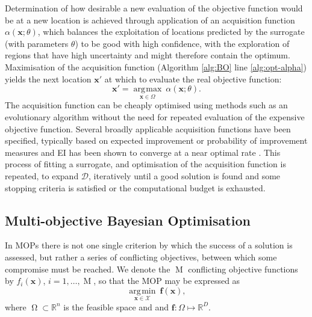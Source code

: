 \documentclass[conference]{IEEEtran}
\DeclareMathOperator*{\parameterspace}{\Omega}
\DeclareMathOperator*{\nobj}{M}
\DeclareMathOperator*{\argmax}{\arg\!\max}
\DeclareMathOperator*{\argmin}{\arg\!\min}
\newcommand\ei{EI\xspace}
\newcommand\mX{\mathcal{X}}
\newcommand{\bx}{\mathbf{x}}
\begin{document}
Determination of how desirable a new evaluation of the objective function
would be at a new location is achieved through application of an acquisition function $\alpha(\mathbf{x};  \theta)$, which balances the exploitation of locations predicted by the surrogate (with parameters $\theta$) to be good with high confidence, with the exploration of regions that have high uncertainty and might therefore contain the optimum. Maximisation of the acquisition function (Algorithm \ref{alg:BO} line \ref{alg:opt-alpha}) yields the next location $\bx'$ at which to evaluate the real objective function: 
\begin{equation}\label{eqn: argmax_alpha}
   \bx' = \underset{\mathbf{x} \in \Omega}{\argmax}\:\alpha(\mathbf{x};  \theta).
\end{equation}
The acquisition function can be cheaply optimised using methods such as an evolutionary algorithm without the need for repeated evaluation of the expensive objective function. Several broadly applicable acquisition functions have been specified, typically based on expected improvement or probability of improvement  measures \cite{jones1998efficient,shahriari2015taking} and \ei has been shown to converge at a near optimal rate \cite{bull2011convergence}. This process of fitting a surrogate, and optimisation of the acquisition function is repeated,  to expand $\mathcal{D}$, iteratively until a good solution is found and some stopping criteria is satisfied or the computational budget is exhausted.

\subsection{Multi-objective Bayesian Optimisation}\label{section:background_MOPs}
In MOPs there is not one single criterion by which the success of a solution is assessed, but rather a series of conflicting objectives, between which some compromise must be reached. We denote the $\nobj$ conflicting objective functions by $f_i(\bx)$, $i = 1, \ldots, \nobj$, so that the MOP may be expressed 
as 
\begin{equation}\label{eqn: min_F}
\underset{\mathbf{x} \in \mX}{\argmin}\:\mathbf{f}(\mathbf{x}), 
\end{equation}
where $\parameterspace \subset \mathbb{R}^n$ is the feasible space and and $\mathbf{f}: \Omega \mapsto \mathbb{R}^{D}$.
\end{document}
